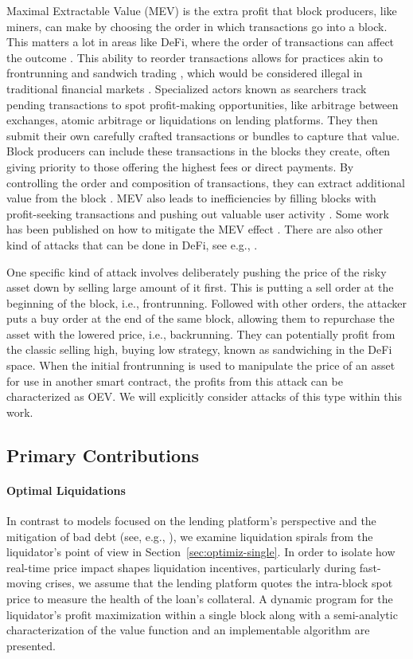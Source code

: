 \documentclass[11pt]{article} %
\begin{document}
Maximal Extractable Value (MEV) is the extra profit that block producers, like miners, can make by choosing the order in which transactions go into a block. This matters a lot in areas like DeFi, where the order of transactions can affect the outcome \citep{daian20}. This ability to reorder transactions allows for practices akin to frontrunning \citep{eskandari19} and sandwich trading \citep{zhou21}, which would be considered illegal in traditional financial markets \citep{auer22}. Specialized actors known as searchers track pending transactions to spot profit-making opportunities, like arbitrage between exchanges, atomic arbitrage or liquidations on lending platforms. They then submit their own carefully crafted transactions or bundles to capture that value. Block producers can include these transactions in the blocks they create, often giving priority to those offering the highest fees or direct payments. By controlling the order and composition of transactions, they can extract additional value from the block \citep{qin22,li23}. MEV also leads to inefficiencies by filling blocks with profit-seeking transactions and pushing out valuable user activity \citep{capponi25}. Some work has been published on how to mitigate the MEV effect \citep{zhou21-1,heimach22,yang23}. There are also other kind of attacks that can be done in DeFi, see e.g., \cite{lee23}.

One specific kind of attack involves deliberately pushing the price of the risky asset down by selling large amount of it first. This is putting a sell order at the beginning of the block, i.e., frontrunning. Followed with other orders, the attacker puts a buy order at the end of the same block, allowing them to repurchase the asset with the lowered price, i.e., backrunning. They can potentially profit from the classic selling high, buying low strategy, known as sandwiching in the DeFi space. When the initial frontrunning is used to manipulate the price of an asset for use in another smart contract, the profits from this attack can be characterized as OEV. We will explicitly consider attacks of this type within this work.
\subsection{Primary Contributions}\label{sec:intro-contribs}
\paragraph{Optimal Liquidations} In contrast to models focused on the lending platform’s perspective and the mitigation of bad debt (see, e.g., \cite{qin21_1}), we examine liquidation spirals from the liquidator's point of view in Section~\ref{sec:optimiz-single}. In order to isolate how real-time price impact shapes liquidation incentives, particularly during fast-moving crises, we assume that the lending platform quotes the intra-block spot price to measure the health of the loan's collateral. A dynamic program for the liquidator's profit maximization within a single block along with a semi-analytic characterization of the value function and an implementable algorithm are presented.
\end{document}
